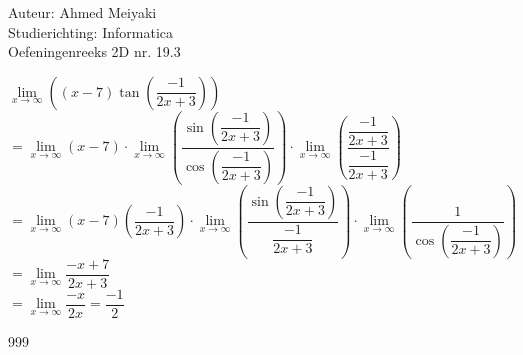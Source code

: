 \documentclass[a4paper]{article}
\begin{document}
  
\noindent \large Auteur: Ahmed Meiyaki \\
\noindent \large Studierichting: Informatica\\
\noindent \large Oefeningenreeks 2D nr. 19.3\\

\medskip

\normalsize

$\lim\limits_{x \rightarrow \infty} \left(\left(x - 7\right) \tan\left(\dfrac{-1}{2x + 3}\right)\right) $\\

$=\lim\limits_{x \rightarrow \infty} \left(x - 7\right) \cdot \lim\limits_{x \rightarrow \infty} \left(\dfrac{\sin\left(\dfrac{-1}{2x + 3}\right)}{\cos\left(\dfrac{-1}{2x + 3}\right)}\right) \cdot \lim\limits_{x \rightarrow \infty} \left(\dfrac{\dfrac{-1}{2x + 3}}{\dfrac{-1}{2x + 3}}\right) $\\

$=\lim\limits_{x \rightarrow \infty} \left(x - 7\right) \left(\dfrac{-1}{2x + 3}\right) \cdot \lim\limits_{x \rightarrow \infty} \left(\dfrac{\sin\left(\dfrac{-1}{2x + 3}\right)}{\dfrac{-1}{2x + 3}}\right) \cdot \lim\limits_{x \rightarrow \infty} \left(\dfrac{1}{\cos\left(\dfrac{-1}{2x + 3}\right)}\right) $\\

$=\lim\limits_{x \rightarrow \infty} \dfrac{-x + 7}{2x + 3} $\\

$=\lim\limits_{x \rightarrow \infty} \dfrac{-x}{2x} = \dfrac{-1}{2} $\\











\begin{thebibliography}{999}
\end{thebibliography}
\end{document}

